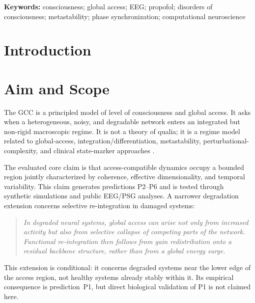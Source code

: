 \documentclass[11pt,a4paper]{article}
\theoremstyle{plain}
\theoremstyle{definition}
\theoremstyle{remark}
\begin{document}
\medskip
\noindent\textbf{Keywords:} consciousness; global access; EEG; propofol; disorders of consciousness; metastability; phase synchronization; computational neuroscience

\newpage

\section*{Introduction}

\section{Aim and Scope}
\label{sec:ziel}

The GCC is a principled model of level of consciousness and global access. It asks when a heterogeneous, noisy, and degradable network enters an integrated but non-rigid macroscopic regime. It is not a theory of qualia; it is a regime model related to global-access, integration/differentiation, metastability, perturbational-complexity, and clinical state-marker approaches \citep{dehaene1998,tononi2004,fries2015,deco2017,casali2013,sitt2014,engemann2018,demertzi2019,mashour2020}.

The evaluated core claim is that access-compatible dynamics occupy a bounded region jointly characterized by coherence, effective dimensionality, and temporal variability. This claim generates predictions P2--P6 and is tested through synthetic simulations and public EEG/PSG analyses. A narrower degradation extension concerns selective re-integration in damaged systems:

\begin{quote}
\itshape
In degraded neural systems, global access can arise not only from increased activity but also from selective collapse of competing parts of the network. Functional re-integration then follows from gain redistribution onto a residual backbone structure, rather than from a global energy surge.
\end{quote}

This extension is conditional: it concerns degraded systems near the lower edge of the access region, not healthy systems already stably within it. Its empirical consequence is prediction~P1, but direct biological validation of P1 is not claimed here.
\end{document}
